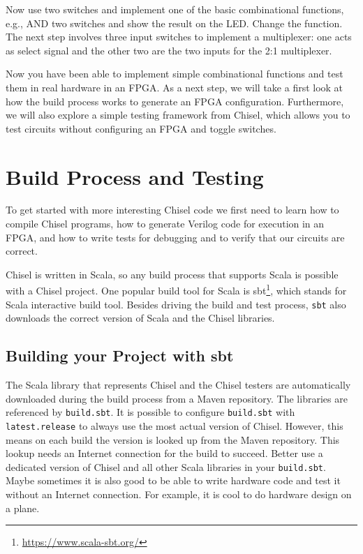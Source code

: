 \documentclass[%
    10pt,
    headinclude, footexclude,
    openright, %
    notitlepage,
    cleardoubleempty,
    headsepline,
    pointlessnumbers,
    bibtotoc, idxtotoc,
    ]{scrbook}
\newcommand{\code}[1]{{\small{\texttt{#1}}}}
\newcommand{\myref}[2]{\href{#1}{#2}}
\renewcommand{\myref}[2]{{#2}{\footnote{\url{#1}}}}
\begin{document}
Now use two switches and implement one of the basic combinational functions,
e.g., AND two switches and show the result on the LED. Change the function.
The next step involves three input switches to implement a multiplexer: one acts as
select signal and the other two are the two inputs for the 2:1 multiplexer.

Now you have been able to implement simple combinational functions and test them
in real hardware in an FPGA. As a next step, we will take a first look at how the build
process works to generate an FPGA configuration. Furthermore, we will also
explore a simple testing framework from Chisel, which allows you to test circuits
without configuring an FPGA and toggle switches.

\chapter{Build Process and Testing}

To get started with more interesting Chisel code we first need to learn how to compile
Chisel programs, how to generate Verilog code for execution in an FPGA, and how
to write tests for debugging and to verify that our circuits are correct.

Chisel is written in Scala, so any build process that supports Scala is possible
with a Chisel project. One popular build tool for Scala is \myref{https://www.scala-sbt.org/}{sbt},
which stands for Scala interactive build tool.
Besides driving the build and test process, \code{sbt} also downloads the correct
version of Scala and the Chisel libraries.

\section{Building your Project with sbt}

The Scala library that represents Chisel and the Chisel testers are automatically
downloaded during the build process from a Maven repository.
The libraries are referenced by \code{build.sbt}. It is possible to configure \code{build.sbt}
with \code{latest.release} to always use the most actual version of Chisel.
However, this means on each build the version is looked up from the Maven
repository. This lookup needs an Internet connection for the build to succeed.
Better use a dedicated version of Chisel and all other Scala libraries in your \code{build.sbt}.
Maybe sometimes it is also good to be able to write hardware code and test it without an Internet connection.
For example, it is cool to do hardware design on a plane.
\end{document}
